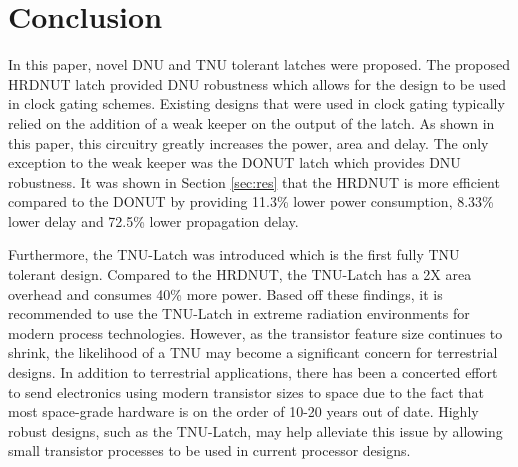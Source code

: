 \section{Conclusion} \label{sec:conc}
In this paper, novel DNU and TNU tolerant latches were proposed. The proposed HRDNUT latch provided DNU robustness which allows for the design to be used in clock gating schemes. Existing designs that were used in clock gating typically relied on the addition of a weak keeper on the output of the latch. As shown in this paper, this circuitry greatly increases the power, area and delay. The only exception to the weak keeper was the DONUT latch which provides DNU robustness. It was shown in Section \ref{sec:res} that the HRDNUT is more efficient compared to the DONUT by providing 11.3\% lower power consumption, 8.33\% lower delay and 72.5\% lower propagation delay. 

Furthermore, the TNU-Latch was introduced which is the first fully TNU tolerant design. Compared to the HRDNUT, the TNU-Latch has a 2X area overhead and consumes 40\% more power. Based off these findings, it is recommended to use the TNU-Latch in extreme radiation environments for modern process technologies. However, as the transistor feature size continues to shrink, the likelihood of a TNU may become a significant concern for terrestrial designs. In addition to terrestrial applications, there has been a concerted effort to send electronics using modern transistor sizes to space due to the fact that most space-grade hardware is on the order of 10-20 years out of date. Highly robust designs, such as the TNU-Latch, may help alleviate this issue by allowing small transistor processes to be used in current processor designs.